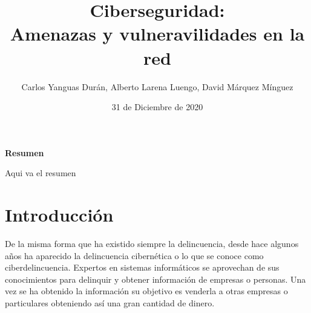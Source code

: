  
  
  

\graphicspath{{../Book/figures/}{../Book/diagrams/}{../Book/photos/}} 

 
\title{{\Huge Ciberseguridad: \\ Amenazas y vulneravilidades en la red}}
\date{{\large 31 de Diciembre de 2020}}
\author{{\Large  Carlos Yanguas Durán, Alberto Larena Luengo, David Márquez Mínguez}}



\maketitle
\thispagestyle{empty}\null\newpage




\setcounter{page}{1}
\begin{center}
 {\bfseries \Large Resumen}
\end{center}

Aqui va el resumen


                  




\hypersetup{linkcolor=blue}

                        
\chapter{Introducción}
\label{cha:introduccion}

De la misma forma que ha existido siempre la delincuencia, desde hace algunos años ha aparecido 
la delincuencia cibernética o lo que se conoce como ciberdelincuencia. Expertos en sistemas 
informáticos se aprovechan de sus conocimientos para delinquir y obtener información de empresas 
o personas. Una vez se ha obtenido la información su objetivo es venderla a otras empresas o 
particulares obteniendo así una gran cantidad de dinero. 

